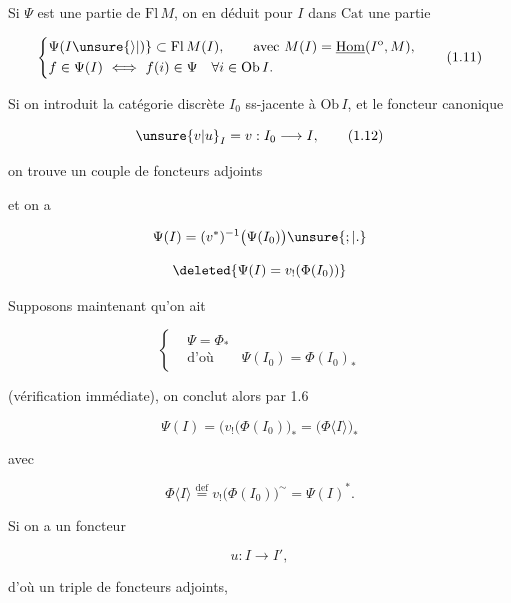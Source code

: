  Si $\Psi$ est une partie de $\mathrm{Fl}\,M$, on en déduit
pour  $I$ dans $\mathrm{Cat}$ une partie

\[
\left\{\begin{aligned}
&\Psi(I\unsure{\rangle|)}\subset\mathrm{Fl}\,M(I),\qquad\text{avec }M(I)=\underline{\mathrm{Hom}}(I^{\mathrm o},M),\\
&f\in\Psi(I)\ \Longleftrightarrow\ f(i)\in\Psi\quad \forall i\in\mathrm{Ob}\,I.
\end{aligned}\right.\tag*{(1.11)}
\]

 Si on introduit la catégorie discrète $I_0$
ss-jacente à $\mathrm{Ob}\,I$, et le foncteur canonique

\[
\unsure{v|u}_I=v:I_0\longrightarrow I,\tag*{(1.12)}
\]

on trouve un couple de foncteurs adjoints


et on a

\[
\Psi(I)=(v^*)^{-1}\big(\Psi(I_0)\big)\unsure{;|.}
\]

\[
\deleted{\Psi(I)=v_!(\Phi(I_0))}
\]

Supposons maintenant qu'on ait

\[
\left\{\begin{aligned}
&\Psi=\Phi_*\\
&\text{d'où}\qquad\Psi(I_0)=\Phi(I_0)_*
\end{aligned}\right.\tag*{(1.14)}
\]

(vérification immédiate), on conclut alors par 1.6

\[
\Psi(I)=\big(v_!(\Phi(I_0)\big)_*=\big(\Phi\langle I\rangle\big)_*\tag*{(1.15)}
\]

avec

\[
\Phi\langle I\rangle\overset{\mathrm{def}}{=}v_!\big(\Phi(I_0)\big)^{\sim}=\Psi(I)^*.\tag*{(1.16)}
\]

Si on a un foncteur

\[
u:I\longrightarrow I',\tag*{(1.17)}
\]

d'où un triple de foncteurs adjoints,

